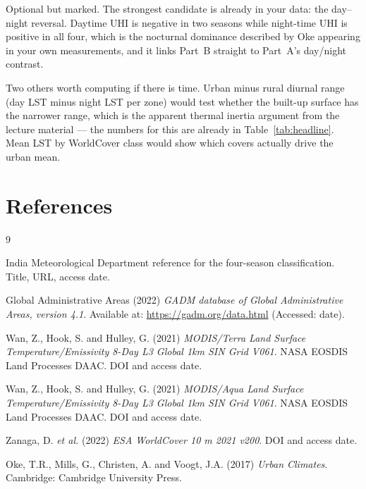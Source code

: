 \documentclass[11pt,a4paper]{article}
\newcommand\TODO{}
\begin{document}
\TODO{Optional but marked. The strongest candidate is already in your
data: the day--night reversal. Daytime UHI is negative in two seasons
while night-time UHI is positive in all four, which is the nocturnal
dominance described by Oke appearing in your own measurements, and it
links Part~B straight to Part~A's day/night contrast.

Two others worth computing if there is time. Urban minus rural diurnal
range (day LST minus night LST per zone) would test whether the
built-up surface has the narrower range, which is the apparent thermal
inertia argument from the lecture material --- the numbers for this
are already in Table~\ref{tab:headline}. Mean LST by WorldCover class
would show which covers actually drive the urban mean.}

\section*{References}

\begin{thebibliography}{9}

\TODO{India Meteorological Department reference for the four-season
classification. Title, URL, access date.}

Global Administrative Areas (2022) \textit{GADM database of Global
Administrative Areas, version 4.1}. Available at:
\url{https://gadm.org/data.html} (Accessed: \TODO{date}).

Wan, Z., Hook, S. and Hulley, G. (2021) \textit{MODIS/Terra Land
Surface Temperature/Emissivity 8-Day L3 Global 1km SIN Grid V061}.
NASA EOSDIS Land Processes DAAC. \TODO{DOI and access date.}

Wan, Z., Hook, S. and Hulley, G. (2021) \textit{MODIS/Aqua Land
Surface Temperature/Emissivity 8-Day L3 Global 1km SIN Grid V061}.
NASA EOSDIS Land Processes DAAC. \TODO{DOI and access date.}

Zanaga, D. \textit{et al.} (2022) \textit{ESA WorldCover 10 m 2021
v200}. \TODO{DOI and access date.}

Oke, T.R., Mills, G., Christen, A. and Voogt, J.A. (2017)
\textit{Urban Climates}. Cambridge: Cambridge University Press.

\end{thebibliography}
\end{document}
